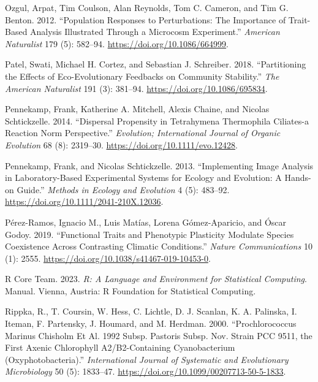\documentclass[
  letterpaper,
  DIV=11,
  numbers=noendperiod]{scrartcl}
\newlength{\cslhangindent}
\newenvironment{CSLReferences}[2] %
 {\begin{list}{}{%
  \setlength{\itemindent}{0pt}
  \setlength{\leftmargin}{0pt}
  \setlength{\parsep}{0pt}
  \ifodd #1
   \setlength{\leftmargin}{\cslhangindent}
   \setlength{\itemindent}{-1\cslhangindent}
  \fi
  \setlength{\itemsep}{#2\baselineskip}}}
 {\end{list}}
\begin{document}
\begin{CSLReferences}{1}{0}
Ozgul, Arpat, Tim Coulson, Alan Reynolds, Tom C. Cameron, and Tim G.
Benton. 2012. {``Population Responses to Perturbations: {The} Importance
of Trait-Based Analysis Illustrated Through a Microcosm Experiment.''}
\emph{American Naturalist} 179 (5): 582--94.
\url{https://doi.org/10.1086/664999}.

Patel, Swati, Michael H. Cortez, and Sebastian J. Schreiber. 2018.
{``Partitioning the {Effects} of {Eco-Evolutionary Feedbacks} on
{Community Stability}.''} \emph{The American Naturalist} 191 (3):
381--94. \url{https://doi.org/10.1086/695834}.

Pennekamp, Frank, Katherine A. Mitchell, Alexis Chaine, and Nicolas
Schtickzelle. 2014. {``Dispersal Propensity in Tetrahymena Thermophila
Ciliates-a Reaction Norm Perspective.''} \emph{Evolution; International
Journal of Organic Evolution} 68 (8): 2319--30.
\url{https://doi.org/10.1111/evo.12428}.

Pennekamp, Frank, and Nicolas Schtickzelle. 2013. {``Implementing Image
Analysis in Laboratory-Based Experimental Systems for Ecology and
Evolution: {A} Hands-on Guide.''} \emph{Methods in Ecology and
Evolution} 4 (5): 483--92.
\url{https://doi.org/10.1111/2041-210X.12036}.

Pérez-Ramos, Ignacio M., Luis Matías, Lorena Gómez-Aparicio, and Óscar
Godoy. 2019. {``Functional Traits and Phenotypic Plasticity Modulate
Species Coexistence Across Contrasting Climatic Conditions.''}
\emph{Nature Communications} 10 (1): 2555.
\url{https://doi.org/10.1038/s41467-019-10453-0}.

R Core Team. 2023. \emph{R: {A} Language and Environment for Statistical
Computing}. Manual. {Vienna, Austria}: {R Foundation for Statistical
Computing}.

Rippka, R., T. Coursin, W. Hess, C. Lichtle, D. J. Scanlan, K. A.
Palinska, I. Iteman, F. Partensky, J. Houmard, and M. Herdman. 2000.
{``Prochlorococcus Marinus {Chisholm} Et Al. 1992 Subsp. Pastoris Subsp.
Nov. Strain {PCC} 9511, the First Axenic Chlorophyll A2/B2-Containing
Cyanobacterium ({Oxyphotobacteria}).''} \emph{International Journal of
Systematic and Evolutionary Microbiology} 50 (5): 1833--47.
\url{https://doi.org/10.1099/00207713-50-5-1833}.


\end{CSLReferences}
\end{document}

